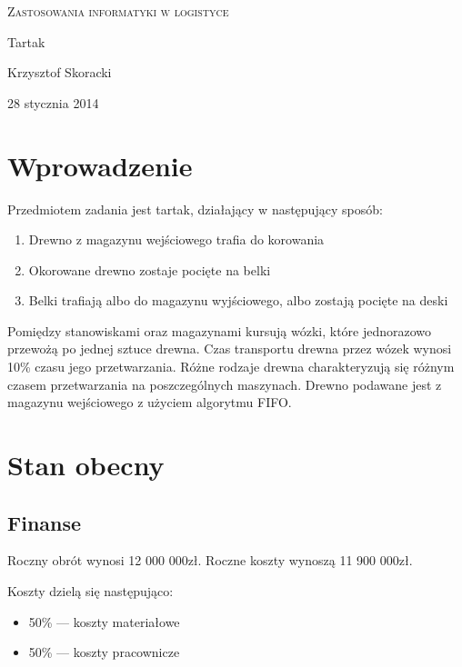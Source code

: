 \documentclass{article}
\begin{document}
\renewcommand*{\tablename}{Tabela}
\begin{center}
{\huge \textsc{Zastosowania informatyki w logistyce}}

\vspace{0.8cm}
{\Large Tartak}
\vspace{0.8cm}

Krzysztof Skoracki
\vspace{0.5cm}

28 stycznia 2014
\vspace{1cm}
\end{center}

\section{Wprowadzenie}

Przedmiotem zadania jest tartak, działający w następujący sposób:

\begin{enumerate}
	\item{Drewno z magazynu wejściowego trafia do korowania}
	\item{Okorowane drewno zostaje pocięte na belki}
	\item{Belki trafiają albo do magazynu wyjściowego, albo zostają pocięte na deski}
\end{enumerate}

Pomiędzy stanowiskami oraz magazynami kursują wózki, które jednorazowo przewożą po jednej sztuce drewna.
Czas transportu drewna przez wózek wynosi 10\% czasu jego przetwarzania.
Różne rodzaje drewna charakteryzują się różnym czasem przetwarzania na poszczególnych maszynach.
Drewno podawane jest z magazynu wejściowego z użyciem algorytmu FIFO.

\section{Stan obecny}

\subsection{Finanse}

Roczny obrót wynosi 12 000 000zł.
Roczne koszty wynoszą 11 900 000zł.

Koszty dzielą się następująco:

\begin{itemize}
	\item{50\% --- koszty materiałowe}
	\item{50\% --- koszty pracownicze}
\end{itemize}
\end{document}
